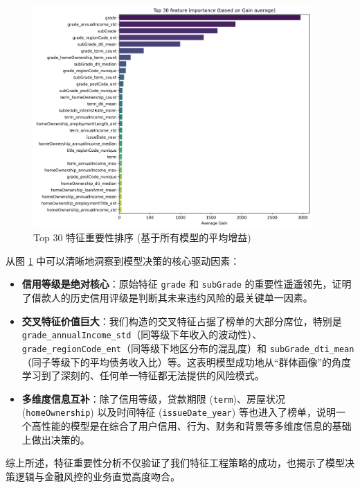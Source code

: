 \documentclass{thuemp}
\begin{document}
\begin{figure}[H]
    \centering
    \includegraphics[width=0.95\textwidth]{image/results/images/first特征重要性.png} %
    \caption{Top 30 特征重要性排序 (基于所有模型的平均增益)}
    \label{fig:feature_importance}
\end{figure}

从图 \ref{fig:feature_importance} 中可以清晰地洞察到模型决策的核心驱动因素：

\begin{itemize}
    \item \textbf{信用等级是绝对核心}：原始特征 \texttt{grade} 和 \texttt{subGrade} 的重要性遥遥领先，证明了借款人的历史信用评级是判断其未来违约风险的最关键单一因素。
    \item \textbf{交叉特征价值巨大}：我们构造的交叉特征占据了榜单的大部分席位，特别是 \texttt{grade\_annualIncome\_std}（同等级下年收入的波动性）、\texttt{grade\_regionCode\_ent}（同等级下地区分布的混乱度）和 \texttt{subGrade\_dti\_mean}（同子等级下的平均债务收入比）等。这表明模型成功地从“群体画像”的角度学习到了深刻的、任何单一特征都无法提供的风险模式。
    \item \textbf{多维度信息互补}：除了信用等级，贷款期限 (\texttt{term})、房屋状况 (\texttt{homeOwnership}) 以及时间特征 (\texttt{issueDate\_year}) 等也进入了榜单，说明一个高性能的模型是在综合了用户信用、行为、财务和背景等多维度信息的基础上做出决策的。
\end{itemize}

综上所述，特征重要性分析不仅验证了我们特征工程策略的成功，也揭示了模型决策逻辑与金融风控的业务直觉高度吻合。
\end{document}

